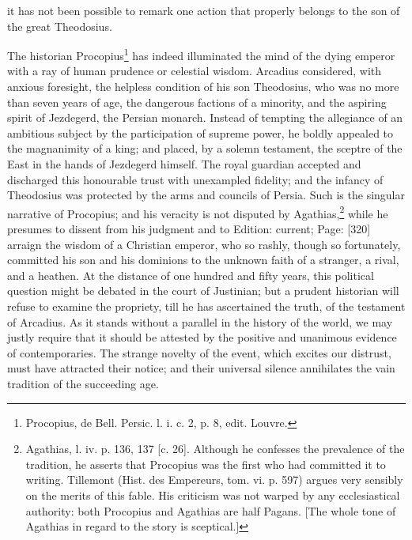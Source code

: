 it has not been possible to remark one action that properly belongs to the son of the great Theodosius.

The historian Procopius\footnote{Procopius, de Bell. Persic. l. i. c. 2, p. 8, edit. Louvre.} has indeed illuminated the mind of the dying emperor with a ray of human prudence or celestial wisdom. Arcadius considered, with anxious foresight, the helpless condition of his son Theodosius, who was no more than seven years of age, the dangerous factions of a minority, and the aspiring spirit of Jezdegerd, the Persian monarch. Instead of tempting the allegiance of an ambitious subject by the participation of supreme power, he boldly appealed to the magnanimity of a king; and placed, by a solemn testament, the sceptre of the East in the hands of Jezdegerd himself. The royal guardian accepted and discharged this honourable trust with unexampled fidelity; and the infancy of Theodosius was protected by the arms and councils of Persia. Such is the singular narrative of Procopius; and his veracity is not disputed by Agathias,\footnote{Agathias, l. iv. p. 136, 137 [c. 26]. Although he confesses the prevalence of the tradition, he asserts that Procopius was the first who had committed it to writing. Tillemont (Hist. des Empereurs, tom. vi. p. 597) argues very sensibly on the merits of this fable. His criticism was not warped by any ecclesiastical authority: both Procopius and Agathias are half Pagans. [The whole tone of Agathias in regard to the story is sceptical.]} while he presumes to dissent from his judgment and to Edition: current; Page: [320] arraign the wisdom of a Christian emperor, who so rashly, though so fortunately, committed his son and his dominions to the unknown faith of a stranger, a rival, and a heathen. At the distance of one hundred and fifty years, this political question might be debated in the court of Justinian; but a prudent historian will refuse to examine the propriety, till he has ascertained the truth, of the testament of Arcadius. As it stands without a parallel in the history of the world, we may justly require that it should be attested by the positive and unanimous evidence of contemporaries. The strange novelty of the event, which excites our distrust, must have attracted their notice; and their universal silence annihilates the vain tradition of the succeeding age.


